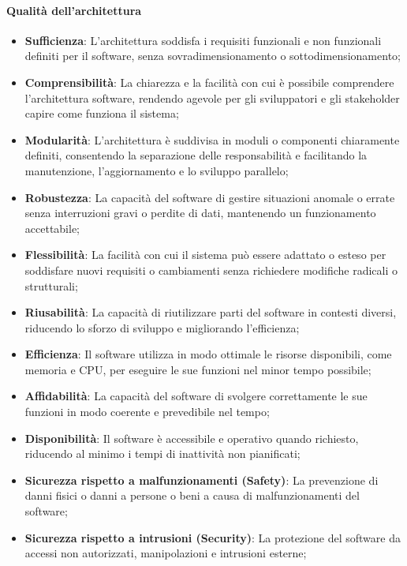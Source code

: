 \paragraph{Qualità dell'architettura}
\begin{itemize}
    \item \textbf{Sufficienza}: L'architettura soddisfa i requisiti funzionali e non funzionali definiti per il software, senza sovradimensionamento o sottodimensionamento;
    \item \textbf{Comprensibilità}: La chiarezza e la facilità con cui è possibile comprendere l'architettura software, rendendo agevole per gli sviluppatori e gli stakeholder capire come funziona il sistema;
    \item \textbf{Modularità}: L'architettura è suddivisa in moduli o componenti chiaramente definiti, consentendo la separazione delle responsabilità e facilitando la manutenzione, l'aggiornamento e lo sviluppo parallelo;
    \item \textbf{Robustezza}: La capacità del software di gestire situazioni anomale o errate senza interruzioni gravi o perdite di dati, mantenendo un funzionamento accettabile;
    \item \textbf{Flessibilità}: La facilità con cui il sistema può essere adattato o esteso per soddisfare nuovi requisiti o cambiamenti senza richiedere modifiche radicali o strutturali;
    \item \textbf{Riusabilità}: La capacità di riutilizzare parti del software in contesti diversi, riducendo lo sforzo di sviluppo e migliorando l'efficienza;
    \item \textbf{Efficienza}: Il software utilizza in modo ottimale le risorse disponibili, come memoria e CPU, per eseguire le sue funzioni nel minor tempo possibile;
    \item \textbf{Affidabilità}: La capacità del software di svolgere correttamente le sue funzioni in modo coerente e prevedibile nel tempo;
    \item \textbf{Disponibilità}: Il software è accessibile e operativo quando richiesto, riducendo al minimo i tempi di inattività non pianificati;
    \item \textbf{Sicurezza rispetto a malfunzionamenti (Safety)}: La prevenzione di danni fisici o danni a persone o beni a causa di malfunzionamenti del software;
    \item \textbf{Sicurezza rispetto a intrusioni (Security)}: La protezione del software da accessi non autorizzati, manipolazioni e intrusioni esterne;

\end{itemize}
